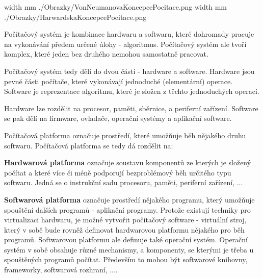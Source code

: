 %
%
%



%


\pdfximage width \the\SirkaOdstavce mm {./Obrazky/VonNeumanovaKoncepcePocitace.png}
\pdfximage width \the\SirkaOdstavce mm {./Obrazky/HarwardskaKoncepcePocitace.png}

\Obsah



Počítačový systém je kombinace hardwaru a softwaru, které dohromady pracuje na vykonávání předem určené úlohy - algoritmus. Počítačový systém ale tvoří komplex, které jeden bez druhého nemohou samostatně pracovat.

Počítačový systém tedy dělí do dvou částí - hardware a software. Hardware jsou pevné části počítače, které vykonávají jednoduché (elementární) operace. Software je reprezentace algoritmu, které je složen z těchto jednoduchých operací.
	
Hardware lze rozdělit na procesor, paměti, sběrnice, a periferní zařízení. Software se pak dělí na firmware, ovladače, operační systémy a aplikační software.



Počítačová platforma označuje prostředí, které umožňuje běh nějakého druhu softwaru. Počítačová platforma se tedy dá rozdělit na:

\vskip 4mm
\vskip 4mm

{\bf Hardwarová platforma} označuje soustavu komponentů ze kterých je složený počítat a které více či méně podporují bezproblémový běh určitého typu softwaru. Jedná se o instrukční sadu procesoru, paměti, periferní zařízení, ... 

{\bf Softwarová platforma} označuje prostředí nějakého programu, který umožňuje spouštění dalších programů - aplikační programy. Protože existují techniky pro virtualizaci hardwaru, je možné vytvořit počítačový software - virtuální stroj, který v sobě bude rovněž definovat hardwarovou platformu nějakého pro běh programů. Softwarovou platformu ale definuje také operační systém. Operační systém v sobě obsahuje různé mechanismy, a komponenty, se kterými je třeba u spouštěných programů počítat. Především to mohou být softwarové knihovny, frameworky, softwarová rozhraní, .... 

